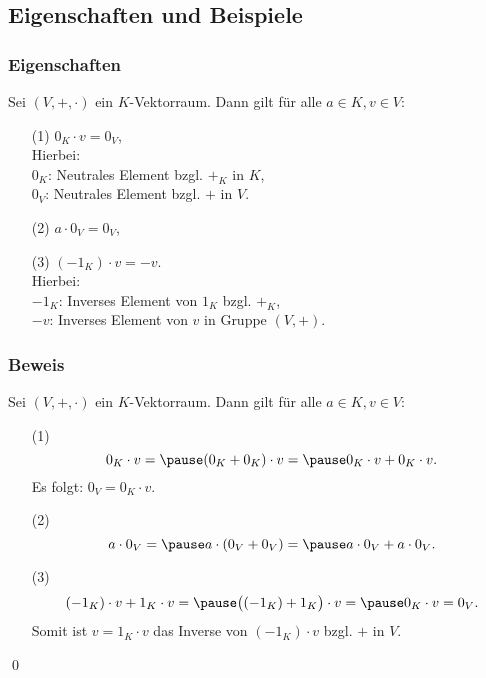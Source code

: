 \subsection{Eigenschaften und Beispiele}
%
\begin{frame}\frametitle{Eigenschaften}
	
	Sei $(V,+,\cdot)$ ein $K$-Vektorraum.
	Dann gilt für alle $a\in K, v\in V$:
	\begin{itemize}
		\item[(1)] 
			$0_{K}\cdot v = 0_V$,\\[1mm]
			
			Hierbei:\\
			$0_{K}$: Neutrales Element bzgl. $+_{K}$ in $K$,\\
			$0_V$: Neutrales Element bzgl. $+$ in $V$.  
			\pause
		\item[(2)] 
			$a\cdot 0_V = 0_V$,
			\pause
		\item[(3)] 
			$(-1_{K})\cdot v = -v$.\\[1mm]
			
			Hierbei:\\
			$-1_{K}$: Inverses Element von $1_{K}$ bzgl. $+_{K}$, \\
			$-v$: Inverses Element von $v$ in Gruppe $(V,+)$.\\[2mm]						
	\end{itemize}
	
\end{frame}
%
%
\begin{frame}\frametitle{Beweis}
	
	Sei $(V,+,\cdot)$ ein $K$-Vektorraum.
	Dann gilt für alle $a\in K, v\in V$: \pause
	\begin{itemize}
		\item[(1)]
			$$
				0_{K}\cdot v =\pause (0_{K} + 0_{K})\cdot v =\pause 0_{K}\cdot v + 0_{K}\cdot v.
			$$
			Es folgt:
			$0_V = 0_{K}\cdot v.$		\pause
		\item[(2)] 
			$$
				a\cdot 0_V =\pause a \cdot (0_V + 0_V) = \pause a\cdot 0_V + a\cdot 0_V.
			$$\pause
		\item[(3)] 
			$$
				(-1_{K})\cdot v + 1_{K}\cdot v =\pause \big((-1_{K}) + 1_{K}\big)\cdot v =\pause 0_{K}\cdot v = 0_V.
			$$
			Somit ist $v= 1_{K}\cdot v$ das Inverse von $(-1_{K})\cdot v$ bzgl. $+$ in $V$.
	\end{itemize}
	\qed	
	
\end{frame}
